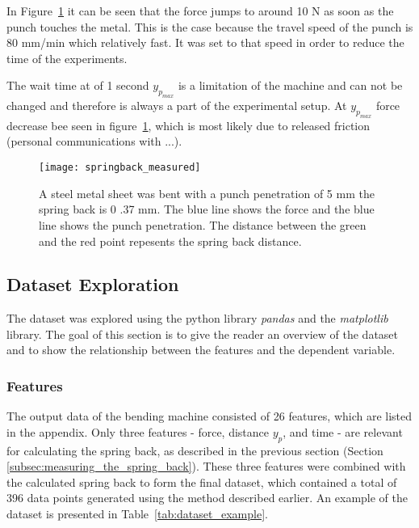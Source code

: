 In Figure~\ref{fig:springback_measured} it can be seen that the force jumps to around 10 N
as soon as the punch touches the metal.
This is the case because the travel speed of the punch is 80 mm/min which relatively fast.
It was set to that speed in order to reduce the time of the experiments.

The wait time at of 1 second $y_p_{max}$ is a limitation of the machine and can not be
changed and therefore is always a part of the experimental setup.
At $y_p_{max}$ force decrease bee seen in figure~\ref{fig:springback_measured}, which is most
likely due to released friction (personal communications with ...).

\begin{figure}[H]
    \begin{tcolorbox}[arc=0pt,boxrule=0.5pt]
        \centering
        \texttt{[image: springback\_measured]}
    \end{tcolorbox}
    \caption{A steel metal sheet was bent with a punch penetration of 5
    mm the spring back is 0 .37 mm. The blue line
    shows the force and the blue line shows the punch penetration.
    The distance between the green and the red point repesents the spring back distance.}
    \label{fig:springback_measured}
\end{figure}

\subsection{Dataset Exploration}\label{subsec:dataset-exploration}
The dataset was explored using the python library \textit{pandas}
\cite{mckinney-proc-scipy-2010} and the \textit{matplotlib}~\cite{Hunter:2007} library.
The goal of this section is to give the reader an overview of the dataset and
to show the relationship between the features and the dependent variable.

\subsubsection{Features}
The output data of the bending machine consisted of 26 features, which are listed in
the appendix.
Only three features - force, distance $y_p$, and time - are relevant for
calculating the spring back, as described in the previous section (Section
\ref{subsec:measuring_the_spring_back}).
These three features were combined with the calculated spring back to form the final
dataset, which contained a total of
396 data points generated using the method described earlier.
An example of the dataset is presented in Table~\ref{tab:dataset_example}.

